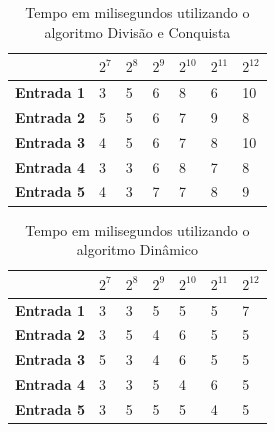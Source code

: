 \documentclass[
	12pt,				%
	oneside,   	        %
	a4paper,			%
	english,			%
	french,				%
	spanish,			%
	brazil,				%
	]{pacotes/abntex2}
\begin{document}
\begin{apendicesenv}
\begin{table}[!htb]
\centering
\caption{Tempo em milisegundos utilizando o algoritmo Divisão e Conquista}
\label{tab:java11}
\footnotesize   %
\begin{tabular}{l|llllll}
\toprule
& \textbf{$2^7$} & \textbf{$2^8$} & \textbf{$2^9$} & \textbf{$2^{10}$} & \textbf{$2^{11}$} & \textbf{$2^{12}$}\\ 
\midrule
\textbf{Entrada 1} & 3 & 5 & 6 & 8 & 6 & 10\\
\textbf{Entrada 2} & 5 & 5 & 6 & 7 & 9 & 8\\
\textbf{Entrada 3} & 4 & 5 & 6 & 7 & 8 & 10\\
\textbf{Entrada 4} & 3 & 3 & 6 & 8 & 7 & 8\\
\textbf{Entrada 5} & 4 & 3 & 7 & 7 & 8 & 9\\

 \bottomrule
\end{tabular}
\end{table}

\begin{table}[!htb]
\centering
\caption{Tempo em milisegundos utilizando o algoritmo Dinâmico}
\label{tab:java12}
\footnotesize   %
\begin{tabular}{l|llllll}
\toprule
& \textbf{$2^7$} & \textbf{$2^8$} & \textbf{$2^9$} & \textbf{$2^{10}$} & \textbf{$2^{11}$} & \textbf{$2^{12}$}\\ 
\midrule
\textbf{Entrada 1} & 3 & 3 & 5 & 5 & 5 & 7\\
\textbf{Entrada 2} & 3 & 5 & 4 & 6 & 5 & 5\\
\textbf{Entrada 3} & 5 & 3 & 4 & 6 & 5 & 5\\
\textbf{Entrada 4} & 3 & 3 & 5 & 4 & 6 & 5\\
\textbf{Entrada 5} & 3 & 5 & 5 & 5 & 4 & 5\\
 \bottomrule
\end{tabular}
\end{table}


\end{apendicesenv}
\end{document}
